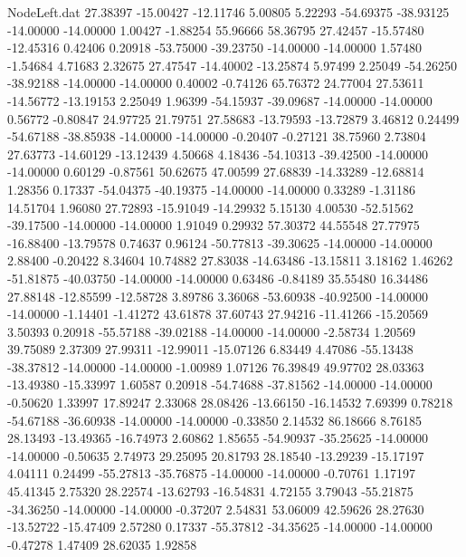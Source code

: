 \begin{filecontents}{NodeLeft.dat}
  27.38397  -15.00427  -12.11746     5.00805    5.22293  -54.69375  -38.93125  -14.00000  -14.00000    1.00427   -1.88254   55.96666   58.36795
  27.42457  -15.57480  -12.45316     0.42406    0.20918  -53.75000  -39.23750  -14.00000  -14.00000    1.57480   -1.54684    4.71683    2.32675
  27.47547  -14.40002  -13.25874     5.97499    2.25049  -54.26250  -38.92188  -14.00000  -14.00000    0.40002   -0.74126   65.76372   24.77004
  27.53611  -14.56772  -13.19153     2.25049    1.96399  -54.15937  -39.09687  -14.00000  -14.00000    0.56772   -0.80847   24.97725   21.79751
  27.58683  -13.79593  -13.72879     3.46812    0.24499  -54.67188  -38.85938  -14.00000  -14.00000   -0.20407   -0.27121   38.75960    2.73804
  27.63773  -14.60129  -13.12439     4.50668    4.18436  -54.10313  -39.42500  -14.00000  -14.00000    0.60129   -0.87561   50.62675   47.00599
  27.68839  -14.33289  -12.68814     1.28356    0.17337  -54.04375  -40.19375  -14.00000  -14.00000    0.33289   -1.31186   14.51704    1.96080
  27.72893  -15.91049  -14.29932     5.15130    4.00530  -52.51562  -39.17500  -14.00000  -14.00000    1.91049    0.29932   57.30372   44.55548
  27.77975  -16.88400  -13.79578     0.74637    0.96124  -50.77813  -39.30625  -14.00000  -14.00000    2.88400   -0.20422    8.34604   10.74882
  27.83038  -14.63486  -13.15811     3.18162    1.46262  -51.81875  -40.03750  -14.00000  -14.00000    0.63486   -0.84189   35.55480   16.34486
  27.88148  -12.85599  -12.58728     3.89786    3.36068  -53.60938  -40.92500  -14.00000  -14.00000   -1.14401   -1.41272   43.61878   37.60743
  27.94216  -11.41266  -15.20569     3.50393    0.20918  -55.57188  -39.02188  -14.00000  -14.00000   -2.58734    1.20569   39.75089    2.37309
  27.99311  -12.99011  -15.07126     6.83449    4.47086  -55.13438  -38.37812  -14.00000  -14.00000   -1.00989    1.07126   76.39849   49.97702
  28.03363  -13.49380  -15.33997     1.60587    0.20918  -54.74688  -37.81562  -14.00000  -14.00000   -0.50620    1.33997   17.89247    2.33068
  28.08426  -13.66150  -16.14532     7.69399    0.78218  -54.67188  -36.60938  -14.00000  -14.00000   -0.33850    2.14532   86.18666    8.76185
  28.13493  -13.49365  -16.74973     2.60862    1.85655  -54.90937  -35.25625  -14.00000  -14.00000   -0.50635    2.74973   29.25095   20.81793
  28.18540  -13.29239  -15.17197     4.04111    0.24499  -55.27813  -35.76875  -14.00000  -14.00000   -0.70761    1.17197   45.41345    2.75320
  28.22574  -13.62793  -16.54831     4.72155    3.79043  -55.21875  -34.36250  -14.00000  -14.00000   -0.37207    2.54831   53.06009   42.59626
  28.27630  -13.52722  -15.47409     2.57280    0.17337  -55.37812  -34.35625  -14.00000  -14.00000   -0.47278    1.47409   28.62035    1.92858

\end{filecontents}
